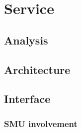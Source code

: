 \section{Service}
\label{Design_Service}

\subsection{Analysis}
\label{Design_Service_Analysis}

\subsection{Architecture}
\label{Design_Service_Architecture}

\subsection{Interface}
\label{Design_Service_Interface}

\subsubsection{SMU involvement}
\label{Design_Service_Interface_SMU}